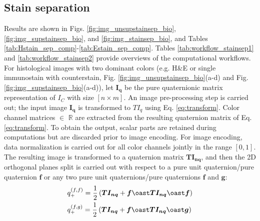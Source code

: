 \documentclass[superscriptaddress,longbibliography,aps,prl,twocolumn,10pt]{revtex4-2}
\begin{document}
\subsection*{\normalsize{Stain separation}}
Results are shown in Figs. \ref{fig:img_unsupstainsep_bio}, \ref{fig:img_supstainsep_bio}, and \ref{fig:img_stainsep_bio}, and Tables \ref{tab:Hstain_sep_comp}-\ref{tab:Estain_sep_comp}. Tables \ref{tab:workflow_stainsep1} and \ref{tab:workflow_stainsep2} provide overviews of the computational workflows. For histological images with two dominant colors (e.g. H\&E or single immunostain with counterstain, Fig. \ref{fig:img_unsupstainsep_bio}(a-d) and Fig. \ref{fig:img_supstainsep_bio}(a-d)), let $\boldsymbol{I_{q}}$ be the pure quaternionic matrix representation of $I_C$ with size $[n \times m]$. An image pre-processing step is carried out; the input image $\boldsymbol{I_{q}}$ is transformed to $TI_{q}$ using Eq. \ref{eq:transform}. Color channel matrices $\in$ $\mathbb{R}$ are extracted from the resulting quaternion matrix of Eq. \ref{eq:transform}. To obtain the output, scalar parts are retained during computations but are discarded prior to image encoding. For image encoding, data normalization is carried out for all color channels jointly in the range $[0,1]$. The resulting image is transformed to a quaternion matrix $\boldsymbol{TI_{nq}}$, and then the 2D orthogonal planes split is carried out with respect to a pure unit quaternion/pure quaternion $\boldsymbol{f}$ or any two pure unit quaternions/pure quaternions $\boldsymbol{f}$ and $\boldsymbol{g}$:
    \begin{equation} \label{eq:stainseparation}
    \begin{aligned}
        &q_{+}^{\left(f,f\right)} = \frac{1}{2} \left(\boldsymbol{TI_{nq}} + \boldsymbol{f} \oast \boldsymbol{TI_{nq}} \oast \boldsymbol{f} \right) \\
        &q_{+}^{\left(f,g\right)} = \frac{1}{2} \left(\boldsymbol{TI_{nq}} + \boldsymbol{f} \oast \boldsymbol{TI_{nq}} \oast \boldsymbol{g} \right)
    \end{aligned}
    \end{equation}
\end{document}

